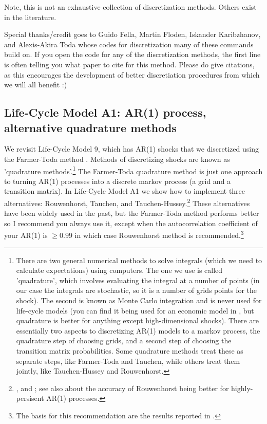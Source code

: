 Note, this is not an exhaustive collection of discretization methods. Others exist in the literature.

Special thanks/credit goes to Guido Fella, Martin Floden, Iskander Karibzhanov, and Alexis-Akira Toda whose codes for discretization many of these commands build on. If you open the code for any of the discretization methods, the first line is often telling you what paper to cite for this method. Please do give citations, as this encourages the development of better discretiation procedures from which we will all benefit :)


\subsection{Life-Cycle Model A1: AR(1) process, alternative quadrature methods}
We revisit Life-Cycle Model 9, which has AR(1) shocks that we discretized using the Farmer-Toda method \citep*{FarmerToda2017}. Methods of discretizing shocks are known as 'quadrature methods'.\footnote{There are two general numerical methods to solve integrals (which we need to calculate expectations) using computers. The one we use is called 'quadrature', which involves evaluating the integral at a number of points (in our case the integrals are stochastic, so it is a number of grids points for the shock). The second is known as Monte Carlo integration and is never used for life-cycle models (you can find it being used for an economic model in \cite*{PalStachurski2013}, but quadrature is better for anything except high-dimensional shocks). There are essentially two aspects to discretizing AR(1) models to a markov process, the quadrature step of choosing grids, and a second step of choosing the transition matrix probabilities. Some quadrature methods treat these as separate steps, like Farmer-Toda and Tauchen, while others treat them jointly, like Tauchen-Hussey and Rouwenhorst.} The Farmer-Toda quadrature method is just one approach to turning AR(1) processes into a discrete markov process (a grid and a transition matrix). In Life-Cycle Model A1 we show how to implement three alternatives: Rouwenhorst, Tauchen, and Tauchen-Hussey.\footnote{\cite*{Rouwenhorst1995}, \cite*{Tauchen1986} and \cite*{TauchenHussey1991}; see also \cite*{KopeckySuen2010} about the accuracy of Rouwenhorst being better for highly-persisent AR(1) processes.} These alternatives have been widely used in the past, but the Farmer-Toda method performs better so I recommend you always use it, except when the autocorrelation coefficient of your AR(1) is $\geq 0.99$ in which case Rouwenhorst method is recommended.\footnote{The basis for this recommendation are the results reported in \cite*{FarmerToda2017}.}

